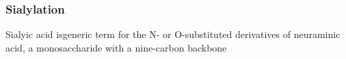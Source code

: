 \subsubsection {Sialylation}
Sialyic acid isgeneric term for the N- or O-substituted derivatives of neuraminic acid, a monosaccharide with a nine-carbon backbone